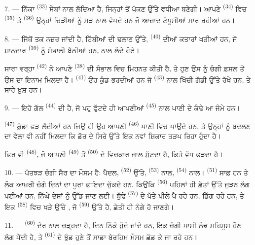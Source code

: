 7. --- ਨਿੱਕਾ  \textsuperscript{(33)} ਸੇਬਾਂ ਨਾਲ ਲੱਦਿਆ ਹੈ,
ਜਿਨ੍ਹਾਂ ਤੋਂ ਪੱਕਣ ਉੱਤੇ ਵਧੀਆ  ਬਣੇਗੀ। ਆਪਣੇ 
\textsuperscript{(34)} ਵਿਚ  \textsuperscript{(35)} ਤੇ
 \textsuperscript{(36)} ਉਨ੍ਹਾਂ ਚਿੜੀਆਂ ਨੂੰ ਸੜ ਨਾਲ ਵੇਖਦੇ ਹਨ ਜੋ
ਆਜ਼ਾਦ ਟੱਪੂਸੀਆਂ ਮਾਰ ਰਹੀਆਂ ਹਨ।

8. --- ਜਿੱਥੋਂ ਤਕ ਨਜ਼ਰ ਜਾਂਦੀ ਹੈ, ਟਿੱਬੀਆਂ ਦੀ ਢਲਾਣ ਉੱਤੇ, 
\textsuperscript{(40)} ਦੀਆਂ ਕਤਾਰਾਂ ਖੜੀਆਂ ਹਨ, ਜੋ ਸ਼ਾਨਦਾਰ 
\textsuperscript{(39)} ਨੂੰ ਸੰਭਾਲੀ ਬੈਠੀਆਂ ਹਨ,  ਨਾਲ ਲੱਦੇ ਹੋਏ।

ਸਾਰਾ ਵਰ੍ਹਾ  \textsuperscript{(42)} ਨੇ ਆਪਣੇ
 \textsuperscript{(38)} ਦੀ ਸੰਭਾਲ ਵਿਚ ਮਿਹਨਤ ਕੀਤੀ ਹੈ, ਤੇ ਹੁਣ
ਉਸ ਨੂੰ ਚੰਗੀ ਫ਼ਸਲ ਤੋਂ ਉਸ ਦਾ ਇਨਾਮ ਮਿਲਦਾ ਹੈ। 
\textsuperscript{(41)} ਉਹ ਕੁੰਡ ਭਰਦੀਆਂ ਹਨ ਜੋ  \textsuperscript{(43)}
ਨਾਲ ਖਿੱਚੀ ਗੱਡੀ ਉੱਤੇ ਰੱਖੇ ਹਨ, ਤੇ ਸਾਰੇ ਖ਼ੁਸ਼ ਹਨ।

\VUsaut{5.0mm}
\VUsaut{3.4mm}

9. --- ਇਹੋ ਗੱਲ  \textsuperscript{(44)} ਦੀ ਹੈ, ਜੋ ਪਹੁ ਫੁੱਟਦੇ ਹੀ
ਆਪਣੀਆਂ  \textsuperscript{(45)} ਨਾਲ ਪਾਣੀ ਦੇ ਕੰਢੇ ਆ ਜੰਮੇ ਹਨ।

 \textsuperscript{(47)} ਕੁੰਡਾ ਫੜ ਲੈਂਦੀਆਂ ਹਨ ਜਿਉਂ ਹੀ ਉਹ ਆਪਣੀ
 \textsuperscript{(46)} ਪਾਣੀ ਵਿਚ ਪਾਉਂਦੇ ਹਨ, ਤੇ ਉਨ੍ਹਾਂ ਨੂੰ
 ਬਦਲਣ ਦਾ ਵੇਲਾ ਵੀ ਨਹੀਂ ਮਿਲਦਾ ਕਿ ਡੋਰ ਦੇ ਸਿਰੇ ਉੱਤੇ ਇਕ ਨਵਾਂ ਸ਼ਿਕਾਰ ਤੜਪ
ਰਿਹਾ ਹੁੰਦਾ ਹੈ।

ਫਿਰ ਵੀ  \textsuperscript{(48)}, ਜੋ ਆਪਣੀ 
\textsuperscript{(49)} ਤੋਂ  \textsuperscript{(50)} ਦੇ ਵਿਚਕਾਰ ਜਾਲ ਸੁੱਟਦਾ
ਹੈ, ਕਿਤੇ ਵੱਧ ਫੜਦਾ ਹੈ।

10. --- ਪੱਤਝੜ ਚੰਗੀ ਸੈਰ ਦਾ ਮੌਸਮ ਹੈ: ਪੈਦਲ,  \textsuperscript{(52)}
ਉੱਤੇ,  \textsuperscript{(53)} ਨਾਲ,  \textsuperscript{(54)}
ਨਾਲ।  \textsuperscript{(51)} ਸਾਫ਼ ਹਨ ਤੇ ਲੋਕ ਆਖ਼ਰੀ ਚੰਗੇ ਦਿਨਾਂ ਦਾ ਪੂਰਾ
ਫ਼ਾਇਦਾ ਚੁੱਕਦੇ ਹਨ, ਕਿਉਂਕਿ  \textsuperscript{(56)} ਪਹਿਲਾਂ ਹੀ ਛੱਤਾਂ
ਉੱਤੇ ਜੁੜਨ ਲੱਗ ਪਈਆਂ ਹਨ, ਨਿੱਘੇ ਦੇਸਾਂ ਨੂੰ ਉੱਡ ਜਾਣ ਲਈ। ਬੁੱਢੇ 
\textsuperscript{(57)} ਦੇ ਪੱਤੇ ਪੀਲੇ ਪੈ ਰਹੇ ਹਨ,  ਡਿੱਗ ਰਹੇ ਹਨ, ਤੇ ਇਕ
 \textsuperscript{(58)} ਵਿਚ ਖੜੇ ਉੱਚੇ , ਜੋ
 \textsuperscript{(59)} ਉੱਤੇ ਹੈ, ਛੇਤੀ ਹੀ ਨੰਗੇ ਹੋ ਜਾਣਗੇ।

11. ---  \textsuperscript{(60)} ਦੇਰ ਨਾਲ ਚੜ੍ਹਦਾ ਹੈ, ਦਿਨ ਨਿੱਕੇ ਹੁੰਦੇ
ਜਾਂਦੇ ਹਨ,  ਇਕ ਚੰਗੀ-ਖ਼ਾਸੀ ਠੰਢ ਮਹਿਸੂਸ ਹੋਣ ਲੱਗ ਪੈਂਦੀ ਹੈ, ਤੇ
 \textsuperscript{(61)} ਦੇ ਝੁੰਡ ਹੁਣੇ ਤੋਂ ਸਾਡਾ ਬੇਰਹਿਮ ਮੌਸਮ ਛੱਡ ਕੇ ਜਾ
ਰਹੇ ਹਨ।
\VUsaut{6.0mm}
\VUfilet{22mm}
